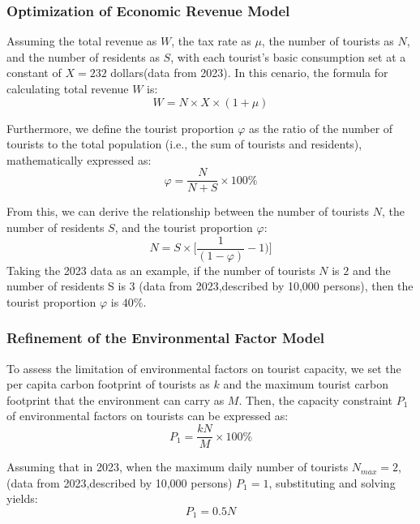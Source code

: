 \documentclass{mcmthesis}
\begin{document}
\subsubsection{Optimization of Economic Revenue Model}
{Assuming the total revenue as $W$, the tax rate
as $\mu$, the number of tourists as $N$, and the number of residents as $S$, with each tourist's basic
consumption set at a constant of $X = 232$ dollars(data from 2023). In this cenario, the formula for
calculating total revenue $W$ is:}
\begin{equation}
  W=N\times X\times(1+\mu)
\end{equation}

{Furthermore, we define the tourist proportion $\varphi$
as the ratio of the number of tourists to the total population (i.e., the sum
of tourists and residents), mathematically expressed as:}
\begin{equation}
  \varphi = \frac{N}{N+S} \times 100 \%
\end{equation}

{From this, we can derive the relationship
between the number of tourists $N$, the number of
residents $S$, and the tourist proportion $\varphi$:}
\begin{equation}
  N = S\times\big [\frac{1}{(1 - \varphi)} - 1) \big ]
\end{equation}
{Taking the 2023 data as an example, if the
number of tourists $N$ is $2$ and the number of residents S is $3$ (data from 2023,described by 10,000 persons), then
the tourist proportion $\varphi$ is $40\%$.}

\subsubsection{Refinement of the Environmental Factor Model}
{To assess the limitation of environmental
factors on tourist capacity, we set the per capita carbon footprint of tourists as $k$ and the
maximum tourist carbon footprint that the environment can carry as $M$. Then, the
capacity constraint $P_1$ of environmental factors on tourists can be expressed
as:}
\begin{equation}
  P_1=\frac{kN}{M}\times 100\%
\end{equation}

{Assuming that in 2023, when the maximum daily
number of tourists $N_{max}=2$,(data from 2023,described by 10,000 persons) $P_1=1$, substituting and solving yields:
}
\begin{equation}
  P_1=0.5N
\end{equation}
\end{document}
